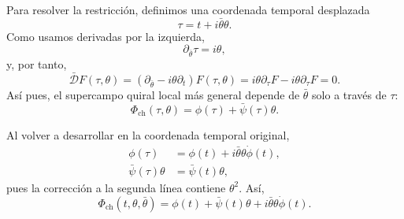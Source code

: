 Para resolver la restricción, definimos una coordenada temporal desplazada
\begin{equation}
\tau=t+i\bar\theta\theta.
\label{eq:l7-chiral-time}
\end{equation}
Como usamos derivadas por la izquierda,
\begin{equation}
\partial_{\bar\theta}\tau=i\theta,
\end{equation}
y, por tanto,
\begin{equation}
\bar{\mathcal D}F(\tau,\theta)
=\left(\partial_{\bar\theta}-i\theta\partial_t\right)F(\tau,\theta)
=i\theta\partial_\tau F-i\theta\partial_\tau F=0.
\end{equation}
Así pues, el supercampo quiral local más general depende de \(\bar\theta\) solo a través de \(\tau\):
\begin{equation}
\Phi_{\mathrm{ch}}(\tau,\theta)
=\phi(\tau)+\bar\psi(\tau)\theta.
\label{eq:l7-chiral-field-tau}
\end{equation}

\begin{classroomqa}
\end{classroomqa}

Al volver a desarrollar en la coordenada temporal original,
\begin{align}
\phi(\tau)
&=\phi(t)+i\bar\theta\theta\dot\phi(t),\\
\bar\psi(\tau)\theta
&=\bar\psi(t)\theta,
\end{align}
pues la corrección a la segunda línea contiene \(\theta^2\). Así,
\begin{equation}
\Phi_{\mathrm{ch}}(t,\theta,\bar\theta)
=\phi(t)+\bar\psi(t)\theta
+i\bar\theta\theta\dot\phi(t).
\label{eq:l7-chiral-field-components}
\end{equation}

\begin{classroomqa}
\end{classroomqa}

